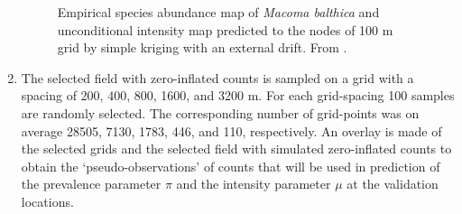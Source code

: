 \documentclass[review]{elsarticle}
\begin{document}
\begin{enumerate}
\begin{figure}[htbp]
\quad
{}
\caption{Empirical species abundance map of \textit{Macoma balthica} \protect{} and unconditional intensity map \protect{} predicted to the nodes of 100 m grid by simple kriging with an external drift. From \citet{lyashevska2015a}.}
\label{fig:rawfield}
\end{figure}

\item
The selected field with zero-inflated counts is sampled on a grid with a spacing of 200, 400, 800, 1600, and 3200 m. For each grid-spacing 100 samples are randomly selected. The corresponding number of grid-points was on average 28505, 7130, 1783, 446, and 110, respectively. An overlay is made of the selected grids and the selected field with simulated zero-inflated counts to obtain the `pseudo-observations' of counts that will be used in prediction of the prevalence parameter $\pi$ and the intensity parameter $\mu$ at the validation locations.


\end{enumerate}
\end{document}
